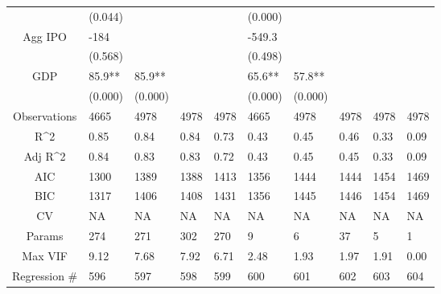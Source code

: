 \documentclass{article}
\begin{document}
\begin{table}[H]
\begin{tabular}{|clllllllll|}
   & (0.044) &  &  &  & (0.000) &  &  &  &  \\
  Agg IPO & -184 &  &  &  & -549.3 &  &  &  &  \\
   & (0.568) &  &  &  & (0.498) &  &  &  &  \\
  GDP & 85.9** & 85.9** &  &  & 65.6** & 57.8** &  &  &  \\
   & (0.000) & (0.000) &  &  & (0.000) & (0.000) &  &  &  \\
  \hline
 Observations & 4665 & 4978 & 4978 & 4978 & 4665 & 4978 & 4978 & 4978 & 4978 \\
  R^2 & 0.85 & 0.84 & 0.84 & 0.73 & 0.43 & 0.45 & 0.46 & 0.33 & 0.09 \\
  Adj R^2 & 0.84 & 0.83 & 0.83 & 0.72 & 0.43 & 0.45 & 0.45 & 0.33 & 0.09 \\
  AIC & 1300 & 1389 & 1388 & 1413 & 1356 & 1444 & 1444 & 1454 & 1469 \\
  BIC & 1317 & 1406 & 1408 & 1431 & 1356 & 1445 & 1446 & 1454 & 1469 \\
  CV & NA & NA & NA & NA & NA & NA & NA & NA & NA \\
  Params & 274 & 271 & 302 & 270 & 9 & 6 & 37 & 5 & 1 \\
  Max VIF & 9.12 & 7.68 & 7.92 & 6.71 & 2.48 & 1.93 & 1.97 & 1.91 & 0.00 \\
  Regression \# & 596 & 597 & 598 & 599 & 600 & 601 & 602 & 603 & 604 \\
   \hline
\end{tabular}

\end{table}
\end{document}
